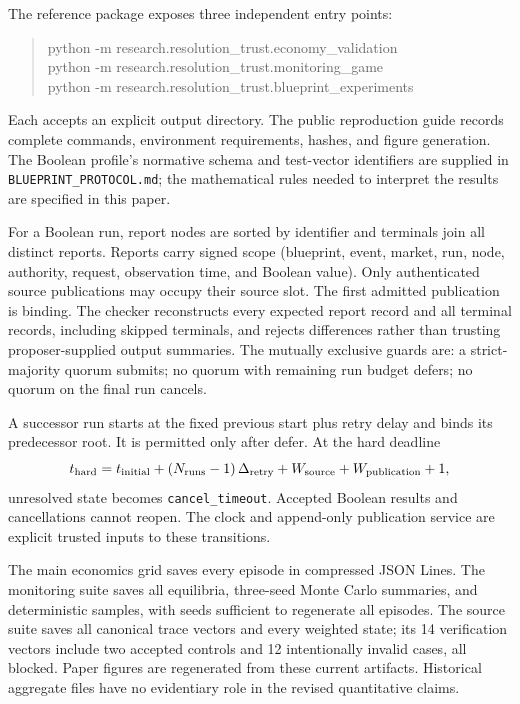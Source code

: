 \documentclass[10pt]{article}
\begin{document}
The reference package exposes three independent entry points:
\begin{quote}\small\ttfamily
python -m research.resolution\_trust.economy\_validation\\
python -m research.resolution\_trust.monitoring\_game\\
python -m research.resolution\_trust.blueprint\_experiments
\end{quote}
Each accepts an explicit output directory. The public reproduction guide records complete commands, environment requirements, hashes, and figure generation. The Boolean profile's normative schema and test-vector identifiers are supplied in \texttt{BLUEPRINT\_PROTOCOL.md}; the mathematical rules needed to interpret the results are specified in this paper.

For a Boolean run, report nodes are sorted by identifier and terminals join all distinct reports. Reports carry signed scope (blueprint, event, market, run, node, authority, request, observation time, and Boolean value). Only authenticated source publications may occupy their source slot. The first admitted publication is binding. The checker reconstructs every expected report record and all terminal records, including skipped terminals, and rejects differences rather than trusting proposer-supplied output summaries. The mutually exclusive guards are: a strict-majority quorum submits; no quorum with remaining run budget defers; no quorum on the final run cancels.

A successor run starts at the fixed previous start plus retry delay and binds its predecessor root. It is permitted only after defer. At the hard deadline
\[
t_{\rm hard}=t_{\rm initial}+(N_{\rm runs}-1)\,\Delta_{\rm retry}
              +W_{\rm source}+W_{\rm publication}+1,
\]
unresolved state becomes \texttt{cancel\_timeout}. Accepted Boolean results and cancellations cannot reopen. The clock and append-only publication service are explicit trusted inputs to these transitions.

The main economics grid saves every episode in compressed JSON Lines. The monitoring suite saves all equilibria, three-seed Monte Carlo summaries, and deterministic samples, with seeds sufficient to regenerate all episodes. The source suite saves all canonical trace vectors and every weighted state; its 14 verification vectors include two accepted controls and 12 intentionally invalid cases, all blocked. Paper figures are regenerated from these current artifacts. Historical aggregate files have no evidentiary role in the revised quantitative claims.
\end{document}
